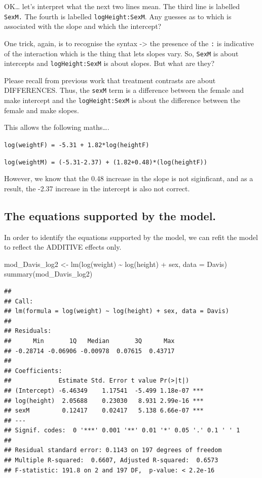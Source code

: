 \documentclass[
]{book}
\newenvironment{Shaded}{\begin{snugshade}}{\end{snugshade}}
\newcommand{\AttributeTok}[1]{\textcolor[rgb]{0.77,0.63,0.00}{#1}}
\newcommand{\FunctionTok}[1]{\textcolor[rgb]{0.00,0.00,0.00}{#1}}
\newcommand{\NormalTok}[1]{#1}
\newcommand{\OtherTok}[1]{\textcolor[rgb]{0.56,0.35,0.01}{#1}}
\newcommand{\SpecialCharTok}[1]{\textcolor[rgb]{0.00,0.00,0.00}{#1}}
\begin{document}
OK\ldots{} let's interpret what the next two lines mean. The third line is labelled \texttt{SexM.} The fourth is labelled \texttt{logHeight:SexM}. Any guesses as to which is associated with the slope and which the intercept?

One trick, again, is to recognise the syntax -\textgreater{} the presence of the \texttt{:} is indicative of the interaction which is the thing that lets slopes vary. So, \texttt{SexM} is about intercepts and \texttt{logHeight:SexM} is about slopes. But what are they?

Please recall from previous work that treatment contrasts are about DIFFERENCES. Thus, the \texttt{sexM} term is a difference between the female and make intercept and the \texttt{logHeight:SexM} is about the difference between the female and make slopes.

This allows the following maths\ldots.

\texttt{log(weightF)\ =\ -5.31\ +\ 1.82*log(heightF)}

\texttt{log(weightM)\ =\ (-5.31-2.37)\ +\ (1.82+0.48)*(log(heightF))}

However, we know that the 0.48 increase in the slope is not siginficant, and as a result, the -2.37 increase in the intercept is also not correct.

\hypertarget{the-equations-supported-by-the-model.}{%
\subsection{The equations supported by the model.}\label{the-equations-supported-by-the-model.}}

In order to identify the equations supported by the model, we can refit the model to reflect the ADDITIVE effects only.

\begin{Shaded}
\begin{Highlighting}[]
\NormalTok{mod\_Davis\_log2 }\OtherTok{\textless{}{-}} \FunctionTok{lm}\NormalTok{(}\FunctionTok{log}\NormalTok{(weight) }\SpecialCharTok{\textasciitilde{}} \FunctionTok{log}\NormalTok{(height) }\SpecialCharTok{+}\NormalTok{ sex, }\AttributeTok{data =}\NormalTok{ Davis)}
\FunctionTok{summary}\NormalTok{(mod\_Davis\_log2)}
\end{Highlighting}
\end{Shaded}

\begin{verbatim}
## 
## Call:
## lm(formula = log(weight) ~ log(height) + sex, data = Davis)
## 
## Residuals:
##      Min       1Q   Median       3Q      Max 
## -0.28714 -0.06906 -0.00978  0.07615  0.43717 
## 
## Coefficients:
##             Estimate Std. Error t value Pr(>|t|)    
## (Intercept) -6.46349    1.17541  -5.499 1.18e-07 ***
## log(height)  2.05688    0.23030   8.931 2.99e-16 ***
## sexM         0.12417    0.02417   5.138 6.66e-07 ***
## ---
## Signif. codes:  0 '***' 0.001 '**' 0.01 '*' 0.05 '.' 0.1 ' ' 1
## 
## Residual standard error: 0.1143 on 197 degrees of freedom
## Multiple R-squared:  0.6607, Adjusted R-squared:  0.6573 
## F-statistic: 191.8 on 2 and 197 DF,  p-value: < 2.2e-16
\end{verbatim}
\end{document}
